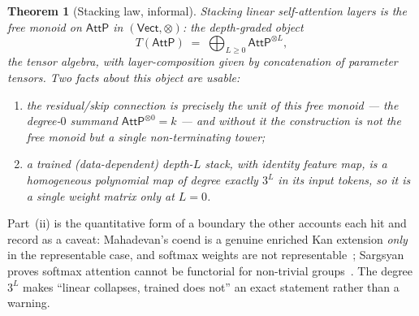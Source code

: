 \documentclass[11pt]{article}
\newcommand{\Vect}{\mathsf{Vect}}
\newcommand{\fld}{k}
\newcommand{\AttP}{\mathsf{AttP}}
\theoremstyle{plain}
\newtheorem{theorem}{Theorem}
\theoremstyle{definition}
\begin{document}
\begin{theorem}[Stacking law, informal]\label{thm:main-informal}
Stacking linear self-attention layers is the free monoid on $\AttP$ in $(\Vect,\otimes)$: the
depth-graded object
\[
  T(\AttP)\;=\;\bigoplus_{L\ge 0}\AttP^{\otimes L},
\]
the tensor algebra, with layer-composition given by concatenation of parameter tensors. Two
facts about this object are usable:
\begin{enumerate}[label=(\roman*),leftmargin=2.2em]
  \item the residual/skip connection is precisely the \emph{unit} of this free monoid --- the
    degree-$0$ summand $\AttP^{\otimes 0}=\fld$ --- and without it the construction is not the
    free monoid but a single non-terminating tower;
  \item a trained (data-dependent) depth-$L$ stack, with identity feature map, is a homogeneous
    polynomial map of degree \emph{exactly} $3^{L}$ in its input tokens, so it is a single weight
    matrix only at $L=0$.
\end{enumerate}
\end{theorem}

Part~(ii) is the quantitative form of a boundary the other accounts each hit and record as a
caveat: Mahadevan's coend is a genuine enriched Kan extension \emph{only} in the representable
case, and softmax weights are not representable~\cite[\S10.6]{ket}; Sargsyan proves softmax
attention cannot be functorial for non-trivial groups~\cite{sargsyan}. The degree $3^{L}$ makes
``linear collapses, trained does not'' an exact statement rather than a warning.
\end{document}
